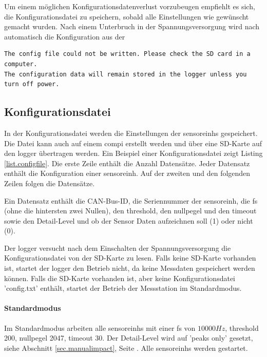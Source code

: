 Um einem möglichen Konfigurationsdatenverlust vorzubeugen empfiehlt es sich, die Konfigurationsdatei zu speichern, sobald alle Einstellungen wie gewünscht gemacht wurden. Nach einem Unterbruch in der Spannungsversorgung wird nach automatisch die Konfiguration aus der 

\begin{lstlisting}[caption=Fehlermeldung beim Speichern der Konfigurationsdatei, label=list.configerror]
The config file could not be written. Please check the SD card in a computer.
The configuration data will remain stored in the logger unless you turn off power.
\end{lstlisting}

\subsection{Konfigurationsdatei}
In der Konfigurationsdatei werden die Einstellungen der \glspl{sensoreinh} gespeichert. Die Datei kann auch auf einem \gls{compi} erstellt werden und über eine SD-Karte auf den \gls{logger} übertragen werden. Ein Beispiel einer Konfigurationsdatei zeigt Listing \ref{list.configfile}. Die erste Zeile enthält die Anzahl Datensätze. Jeder Datensatz enthält die Konfiguration einer \gls{sensoreinh}. Auf der zweiten und den folgenden Zeilen folgen die Datensätze. 

Ein Datensatz enthält die CAN-Bus-ID, die Seriennummer der \gls{sensoreinh}, die \gls{fs} (ohne die hintersten zwei Nullen), den \gls{threshold}, den \gls{nullpegel} und den \gls{timeout} sowie den Detail-Level und ob der Sensor Daten aufzeichnen soll (1) oder nicht (0).

Der \gls{logger} versucht nach dem Einschalten der Spannungsversorgung die Konfigurationsdatei von der SD-Karte zu lesen. Falls keine SD-Karte vorhanden ist, startet der \gls{logger} den Betrieb nicht, da keine Messdaten gespeichert werden können. Falls die SD-Karte vorhanden ist, aber keine Konfigurationsdatei 'config.txt' enthält, startet der Betrieb der Messstation im Standardmodus.

\paragraph{Standardmodus} Im Standardmodus arbeiten alle \glspl{sensoreinh} mit einer \gls{fs} von \ensuremath{10000 Hz}, \gls{threshold} 200, \gls{nullpegel} 2047, \gls{timeout} 30. Der Detail-Level wird auf 'peaks only' gesetzt, siehe Abschnitt \ref{sec.manualimpact}, Seite \pageref{sec.manualimpact}. Alle \glspl{sensoreinh} werden gestartet.

